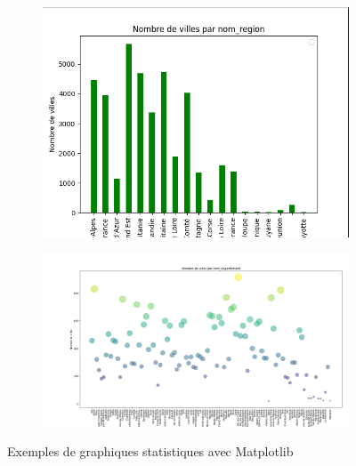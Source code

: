 \begin{figure}[!h]
    \centering
    \begin{subfigure}[b]{0.45\textwidth}
        \includegraphics[width=\textwidth]{images/Exemple-Histogramme.png}
    \end{subfigure}
    \begin{subfigure}[b]{0.45\textwidth}
        \includegraphics[width=\textwidth]{images/Exemple-Scatter.png}
    \end{subfigure}
    \caption{Exemples de graphiques statistiques avec Matplotlib}
    \label{Exemple-1-Graph-Matplotlib}
\end{figure}



